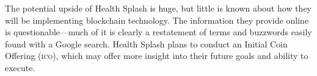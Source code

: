   The potential upside of Health Splash is huge, but little is known about how they will be implementing blockchain technology. The information they provide online is questionable---much of it is clearly a restatement of terms and buzzwords easily found with a Google search. Health Splash plans to conduct an Initial Coin Offering (\textsc{ico}), which may offer more insight into their future goals and ability to execute.%

  
